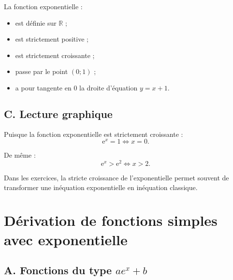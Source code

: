 \documentclass[11pt,a4paper]{article}
\newcommand{\R}{\mathbb{R}}
\newcommand{\e}{\mathrm{e}}
\begin{document}
\begin{center}
\end{center}

\begin{retenir}
La fonction exponentielle :
\begin{itemize}
    \item est définie sur $\R$ ;
    \item est strictement positive ;
    \item est strictement croissante ;
    \item passe par le point $(0;1)$ ;
    \item a pour tangente en $0$ la droite d'équation $y=x+1$.
\end{itemize}
\end{retenir}

\subsection*{C. Lecture graphique}

Puisque la fonction exponentielle est strictement croissante :
\[
\e^x=1 \Longleftrightarrow x=0.
\]

De même :
\[
\e^x>\e^2 \Longleftrightarrow x>2.
\]

\begin{pointbac}
Dans les exercices, la stricte croissance de l'exponentielle permet souvent de transformer une inéquation exponentielle en inéquation classique.
\end{pointbac}

\section{Dérivation de fonctions simples avec exponentielle}

\subsection*{A. Fonctions du type $ae^x+b$}
\end{document}
